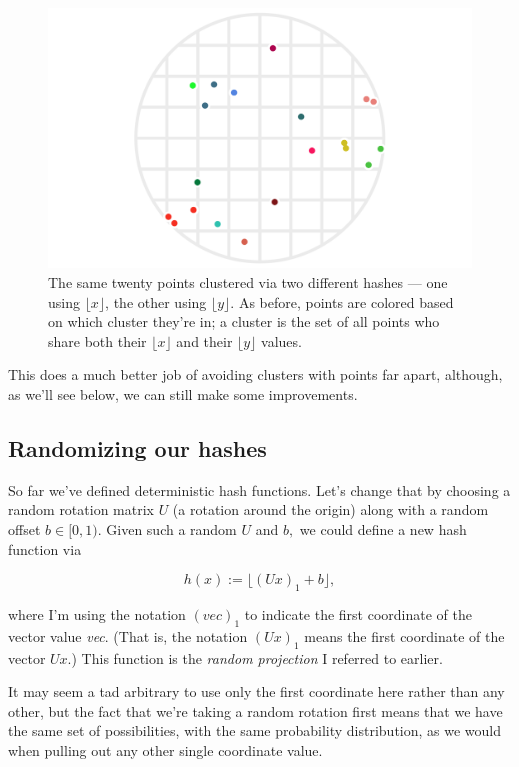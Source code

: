 \documentclass[20pt,]{extarticle}
\begin{document}
\begin{figure}
\centering
\includegraphics{images/lsh_image3.png}
\caption{The same twenty points clustered via two different hashes ---
one using \(\lfloor x\rfloor\), the other using \(\lfloor y\rfloor.\) As
before, points are colored based on which cluster they're in; a cluster
is the set of all points who share both their \(\lfloor x\rfloor\) and
their \(\lfloor y\rfloor\) values.}\label{fig:fig3}
\end{figure}

This does a much better job of avoiding clusters with points far apart,
although, as we'll see below, we can still make some improvements.

\subsection{Randomizing our hashes}\label{randomizing-our-hashes}

So far we've defined deterministic hash functions. Let's change that by
choosing a random rotation matrix \(U\) (a rotation around the origin)
along with a random offset \(b \in [0, 1).\) Given such a random \(U\)
and \(b,\) we could define a new hash function via

\[ h(x) := \lfloor (Ux)_1 + b \rfloor, \]

where I'm using the notation \(( \textit{vec} )_1\) to indicate the
first coordinate of the vector value \emph{vec}. (That is, the notation
\((Ux)_1\) means the first coordinate of the vector \(Ux\).) This
function is the \emph{random projection} I referred to earlier.

It may seem a tad arbitrary to use only the first coordinate here rather
than any other, but the fact that we're taking a random rotation first
means that we have the same set of possibilities, with the same
probability distribution, as we would when pulling out any other single
coordinate value.
\end{document}
